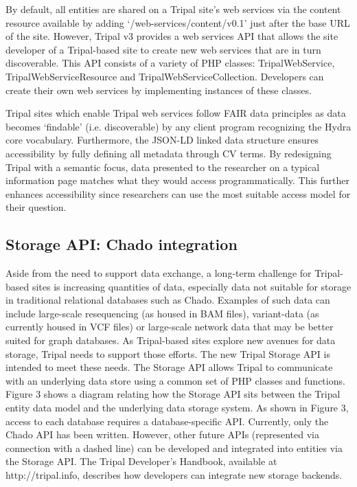 By default, all entities are shared on a Tripal site’s web services via the content resource available by adding ‘/web-services/content/v0.1’ just after the base URL of the site. However, Tripal v3 provides a web services API that allows the site developer of a Tripal-based site to create new web services that are in turn discoverable. This API consists of a variety of PHP classes: TripalWebService, TripalWebServiceResource and TripalWebServiceCollection. Developers can create their own web services by implementing instances of these classes.

Tripal sites which enable Tripal web services follow FAIR data principles as data becomes ‘findable’ (i.e. discoverable) by any client program recognizing the Hydra core vocabulary. Furthermore, the JSON-LD linked data structure ensures accessibility by fully defining all metadata through CV terms. By redesigning Tripal with a semantic focus, data presented to the researcher on a typical information page matches what they would access programmatically. This further enhances accessibility since researchers can use the most suitable access model for their question.

\subsection*{Storage API: Chado integration}

Aside from the need to support data exchange, a long-term challenge for Tripal-based sites is increasing quantities of data, especially data not suitable for storage in traditional relational databases such as Chado. Examples of such data can include large-scale resequencing (as housed in BAM files), variant-data (as currently housed in VCF files) or large-scale network data that may be better suited for graph databases. As Tripal-based sites explore new avenues for data storage, Tripal needs to support those efforts. The new Tripal Storage API is intended to meet these needs. The Storage API allows Tripal to communicate with an underlying data store using a common set of PHP classes and functions. Figure 3 shows a diagram relating how the Storage API sits between the Tripal entity data model and the underlying data storage system. As shown in Figure 3, access to each database requires a database-specific API. Currently, only the Chado API has been written. However, other future APIs (represented via connection with a dashed line) can be developed and integrated into entities via the Storage API. The Tripal Developer’s Handbook, available at http://tripal.info, describes how developers can integrate new storage backends.

